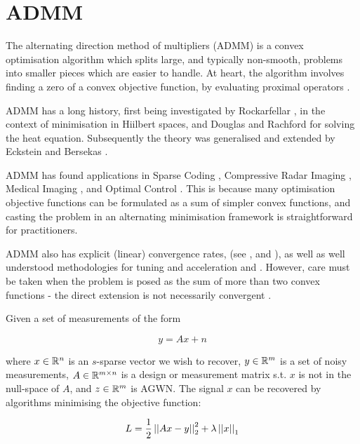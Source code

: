 \section{ADMM}
The alternating direction method of multipliers (ADMM) is a convex optimisation algorithm which splits large, and typically non-smooth, problems into smaller pieces which are easier to handle. At heart, the algorithm involves finding a zero of a convex objective function, by evaluating proximal operators \cite{parikh2014proximal}. 

ADMM has a long history, first being investigated by Rockarfellar \cite{rockafellar1976monotone}, in the context of minimisation in Hiilbert spaces, and Douglas and Rachford \cite{douglas1956numerical} for solving the heat equation. Subsequently the theory was generalised and extended by Eckstein and Bersekas \cite{eckstein1992douglas}.

ADMM has found applications in Sparse Coding \cite{Bristow2014}, Compressive Radar Imaging \cite{heredia2015consensus}, Medical Imaging \cite{sawatzky2014proximal}, and Optimal Control \cite{o2013splitting}. This is because many optimisation objective functions can be formulated as a sum of simpler convex functions, and casting the problem in an alternating minimisation framework is straightforward for practitioners.

ADMM also has explicit (linear) convergence rates, 
(see \cite{Shi2013}, and \cite{nishihara2015general}), as well as well understood methodologies for tuning and acceleration \cite{ghadimi2015optimal} and \cite{goldstein2014fast}. However, care must be taken when the problem is posed as the sum of more than two convex functions - the direct extension is not necessarily convergent \cite{chen2016direct}.

Given a set of measurements of the form

\begin{equation}
y = Ax + n 
\end{equation}

where \(x \in {\mathbb{R}}^n\) is an \(s\)-sparse vector we wish to recover, \(y \in {\mathbb{R}}^m\) is a set of noisy measurements, \(A \in {\mathbb{R}}^{m \times n}\) is a design or measurement matrix s.t. \(x\) is not in the null-space of \(A\), and \(z \in {\mathbb{R}}^m\) is AGWN. The signal \(x\) can be recovered by algorithms minimising the objective function:

\begin{equation}
L = \frac{1}{2} \left|\left|Ax-y\right|\right|_2^2 + \lambda\left|\left|x\right|\right|_1
\label{LASSO}
\end{equation}

